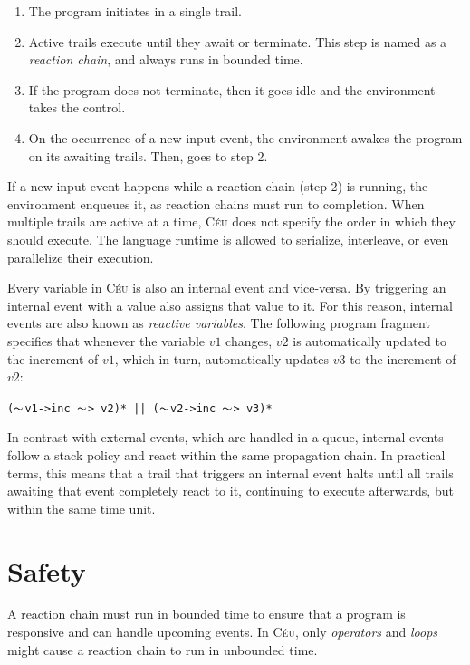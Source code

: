 \documentclass[10pt]{sigplan-proc-varsize-sensys11}
\newcommand{\2}{\;\;}
\newcommand{\5}{\;\;\;\;\;}
\newcommand{\til}{$\thicksim$}
\newcommand{\CEU}{\textsc{C\'{e}u}}
\newcommand{\Code}[1] {\texttt{#1}}
\begin{document}
\begin{enumerate}
\item The program initiates in a single trail.
\item Active trails execute until they await or terminate.
      This step is named as a \emph{reaction chain}, and always runs in bounded 
      time.
\item If the program does not terminate, then it goes idle and the environment 
      takes the control.
\item On the occurrence of a new input event, the environment awakes the 
      program on its awaiting trails.
      Then, goes to step 2.
\end{enumerate}

If a new input event happens while a reaction chain (step 2) is running, the 
environment enqueues it, as reaction chains must run to completion.
When multiple trails are active at a time, \CEU{} does not specify the order in 
which they should execute.
The language runtime is allowed to serialize, interleave, or even parallelize 
their execution.

Every variable in \CEU{} is also an internal event and vice-versa.
By triggering an internal event with a value also assigns that value to it.
For this reason, internal events are also known as \emph{reactive variables}.
The following program fragment specifies that whenever the variable $v1$ 
changes, $v2$ is automatically updated to the increment of $v1$, which in turn, 
automatically updates $v3$ to the increment of $v2$:

\Code{(\til{}v1->inc \til{}> v2)* || (\til{}v2->inc \til{}> v3)*}

In contrast with external events, which are handled in a queue, internal events 
follow a stack policy and react within the same propagation chain.
In practical terms, this means that a trail that triggers an internal event 
halts until all trails awaiting that event completely react to it, continuing 
to execute afterwards, but within the same time unit.

\section{Safety}
\label{sec.safety}

A reaction chain must run in bounded time to ensure that a program is 
responsive and can handle upcoming events.
In \CEU, only \emph{operators} and \emph{loops} might cause a reaction chain to 
run in unbounded time.
\end{document}

